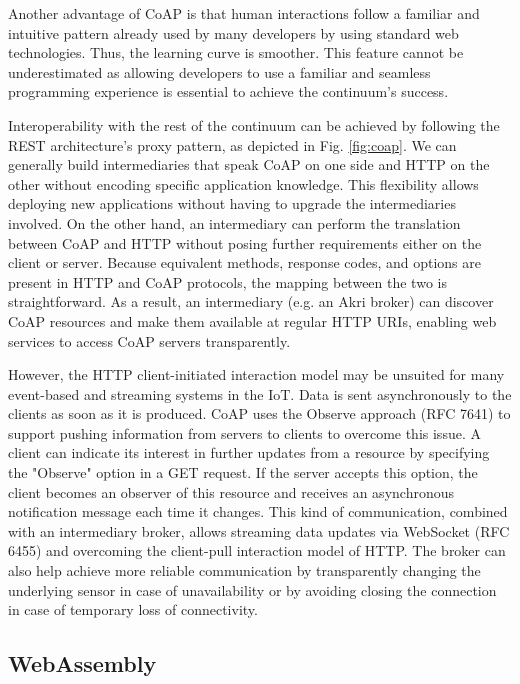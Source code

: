 Another advantage of CoAP is that human interactions follow a familiar and intuitive pattern already used by many developers by using standard web technologies. Thus, the learning curve is smoother. This feature cannot be underestimated as allowing developers to use a familiar and seamless programming experience is essential to achieve the continuum's success.

Interoperability with the rest of the continuum can be achieved by following the REST architecture's proxy pattern, as depicted in Fig. \ref{fig:coap}. We can generally build intermediaries that speak CoAP on one side and HTTP on the other without encoding specific application knowledge. This flexibility allows deploying new applications without having to upgrade the intermediaries involved. On the other hand, an intermediary can perform the translation between CoAP and HTTP without posing further requirements either on the client or server. Because equivalent methods, response codes, and options are present in HTTP and CoAP protocols, the mapping between the two is straightforward. As a result, an intermediary (e.g. an Akri broker) can discover CoAP resources and make them available at regular HTTP URIs, enabling web services to access CoAP servers transparently.

However, the HTTP client-initiated interaction model may be unsuited for many event-based and streaming systems in the IoT. Data is sent asynchronously to the clients as soon as it is produced. CoAP uses the Observe approach (RFC 7641) to support pushing information from servers to clients to overcome this issue. A client can indicate its interest in further updates from a resource by specifying the "Observe" option in a GET request. If the server accepts this option, the client becomes an observer of this resource and receives an asynchronous notification message each time it changes. This kind of communication, combined with an intermediary broker, allows streaming data updates via WebSocket (RFC 6455) and overcoming the client-pull interaction model of HTTP. The broker can also help achieve more reliable communication by transparently changing the underlying sensor in case of unavailability or by avoiding closing the connection in case of temporary loss of connectivity.

\subsection{WebAssembly}
\label{sec:webassembly}

